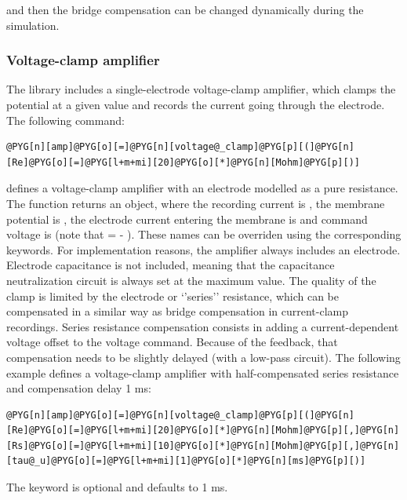 \documentclass[letterpaper,10pt,english]{manual}
\begin{document}
and then the bridge compensation can be changed dynamically during the simulation.


\subsubsection{Voltage-clamp amplifier}

The library includes a single-electrode voltage-clamp amplifier, which
clamps the potential at a given value and records the current going through
the electrode.
The following command:

\begin{Verbatim}[commandchars=@\[\]]
@PYG[n][amp]@PYG[o][=]@PYG[n][voltage@_clamp]@PYG[p][(]@PYG[n][Re]@PYG[o][=]@PYG[l+m+mi][20]@PYG[o][*]@PYG[n][Mohm]@PYG[p][)]
\end{Verbatim}

defines a voltage-clamp amplifier with an electrode modelled as a pure
resistance.
The function
returns an \hyperlink{brian.Equations}{} object, where
the recording current is , the membrane potential is , the electrode current
entering the membrane is  and command voltage is 
(note that  = - ).
These names can be overriden using the corresponding keywords.
For implementation reasons, the amplifier always includes an electrode.
Electrode capacitance is not included, meaning that
the capacitance neutralization circuit is always set at the maximum value.
The quality of the clamp is limited by the electrode or `'series'' resistance,
which can be compensated in a similar way as bridge compensation in current-clamp
recordings. Series resistance compensation consists in adding a current-dependent
voltage offset to the voltage command. Because of the feedback, that compensation needs
to be slightly delayed (with a low-pass circuit). The following example defines a
voltage-clamp amplifier with half-compensated series resistance and compensation delay
1 ms:

\begin{Verbatim}[commandchars=@\[\]]
@PYG[n][amp]@PYG[o][=]@PYG[n][voltage@_clamp]@PYG[p][(]@PYG[n][Re]@PYG[o][=]@PYG[l+m+mi][20]@PYG[o][*]@PYG[n][Mohm]@PYG[p][,]@PYG[n][Rs]@PYG[o][=]@PYG[l+m+mi][10]@PYG[o][*]@PYG[n][Mohm]@PYG[p][,]@PYG[n][tau@_u]@PYG[o][=]@PYG[l+m+mi][1]@PYG[o][*]@PYG[n][ms]@PYG[p][)]
\end{Verbatim}

The  keyword is optional and defaults to 1 ms.
\end{document}

